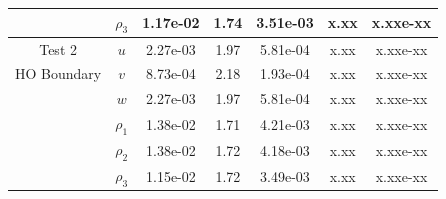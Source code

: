 \documentclass[final]{siamltex}
\begin{document}
\begin{table}[h]
\begin{center}
\begin{tabular}{ccccccc}
                    & $\rho_3$ & 1.17e-02 & 1.74 & 3.51e-03 & x.xx & x.xxe-xx \\
\hline
Test 2              & $u$      & 2.27e-03 & 1.97 & 5.81e-04 & x.xx & x.xxe-xx \\
HO Boundary         & $v$      & 8.73e-04 & 2.18 & 1.93e-04 & x.xx & x.xxe-xx \\
                    & $w$      & 2.27e-03 & 1.97 & 5.81e-04 & x.xx & x.xxe-xx \\
                    & $\rho_1$ & 1.38e-02 & 1.71 & 4.21e-03 & x.xx & x.xxe-xx \\
                    & $\rho_2$ & 1.38e-02 & 1.72 & 4.18e-03 & x.xx & x.xxe-xx \\
                    & $\rho_3$ & 1.15e-02 & 1.72 & 3.49e-03 & x.xx & x.xxe-xx
\end{tabular}
\end{center}
\end{table}
\end{document}
